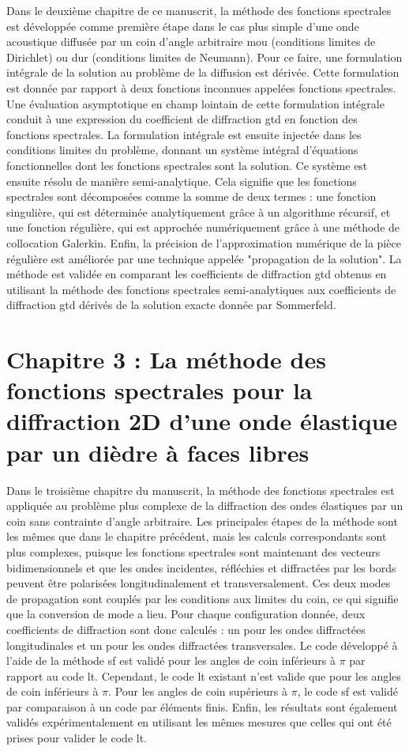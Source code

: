 Dans le deuxième chapitre de ce manuscrit, la méthode des fonctions spectrales est développée comme première étape dans le cas plus simple d'une onde acoustique diffusée par un coin d'angle arbitraire mou (conditions limites de Dirichlet) ou dur (conditions limites de Neumann). Pour ce faire, une formulation intégrale de la solution au problème de la diffusion est dérivée. Cette formulation est donnée par rapport à deux fonctions inconnues appelées fonctions spectrales. Une évaluation asymptotique en champ lointain de cette formulation intégrale conduit à une expression du coefficient de diffraction \acrshort{gtd} en fonction des fonctions spectrales. La formulation intégrale est ensuite injectée dans les conditions limites du problème, donnant un système intégral d'équations fonctionnelles dont les fonctions spectrales sont la solution. Ce système est ensuite résolu de manière semi-analytique. Cela signifie que les fonctions spectrales sont décomposées comme la somme de deux termes : une fonction singulière, qui est déterminée analytiquement grâce à un algorithme récursif, et une fonction régulière, qui est approchée numériquement grâce à une méthode de collocation Galerkin. Enfin, la précision de l'approximation numérique de la pièce régulière est améliorée par une technique appelée "propagation de la solution". La méthode est validée en comparant les coefficients de diffraction \acrshort{gtd} obtenus en utilisant la méthode des fonctions spectrales semi-analytiques aux coefficients de diffraction \acrshort{gtd} dérivés de la solution exacte donnée par Sommerfeld.

\section{Chapitre 3 : La méthode des fonctions spectrales pour la diffraction 2D d'une onde élastique par un dièdre à faces libres}

Dans le troisième chapitre du manuscrit, la méthode des fonctions spectrales est appliquée au problème plus complexe de la diffraction des ondes élastiques par un coin sans contrainte d'angle arbitraire. Les principales étapes de la méthode sont les mêmes que dans le chapitre précédent, mais les calculs correspondants sont plus complexes, puisque les fonctions spectrales sont maintenant des vecteurs bidimensionnels et que les ondes incidentes, réfléchies et diffractées par les bords peuvent être polarisées longitudinalement et transversalement. Ces deux modes de propagation sont couplés par les conditions aux limites du coin, ce qui signifie que la conversion de mode a lieu. Pour chaque configuration donnée, deux coefficients de diffraction sont donc calculés : un pour les ondes diffractées longitudinales et un pour les ondes diffractées transversales. Le code développé à l'aide de la méthode \acrfull{sf} est validé pour les angles de coin inférieurs à $\pi$ par rapport au code \acrfull{lt}. Cependant, le code \acrshort{lt} existant n'est valide que pour les angles de coin inférieurs à $\pi$. Pour les angles de coin supérieurs à $\pi$, le code \acrshort{sf} est validé par comparaison à un code par éléments finis. Enfin, les résultats sont également validés expérimentalement en utilisant les mêmes mesures que celles qui ont été prises pour valider le code \acrshort{lt}.


